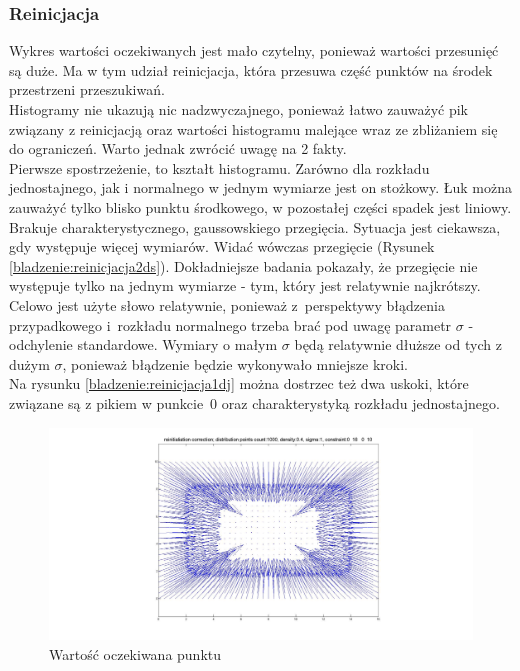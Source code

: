 \documentclass{mini}
\begin{document}
\subsubsection*{Reinicjacja}
Wykres wartości oczekiwanych jest mało czytelny, ponieważ wartości przesunięć są duże. Ma w tym udział reinicjacja, która przesuwa część punktów na środek przestrzeni przeszukiwań.\\
Histogramy nie ukazują nic nadzwyczajnego, ponieważ łatwo zauważyć pik związany z reinicjacją oraz wartości histogramu malejące wraz ze zbliżaniem się do ograniczeń. Warto jednak zwrócić uwagę na 2 fakty.\\
Pierwsze spostrzeżenie, to kształt histogramu. Zarówno dla rozkładu jednostajnego, jak i normalnego w jednym wymiarze jest on stożkowy. Łuk można zauważyć tylko blisko punktu środkowego, w pozostałej części spadek jest liniowy. Brakuje charakterystycznego, gaussowskiego przegięcia. Sytuacja jest ciekawsza, gdy występuje więcej wymiarów. Widać wówczas przegięcie (Rysunek \ref{bladzenie:reinicjacja2ds}). Dokładniejsze badania pokazały, że przegięcie nie występuje tylko na jednym wymiarze - tym, który jest relatywnie najkrótszy. Celowo jest użyte słowo relatywnie, ponieważ z~perspektywy błądzenia przypadkowego i~rozkładu normalnego trzeba brać pod uwagę parametr $\sigma$ - odchylenie standardowe. Wymiary o małym $\sigma$ będą relatywnie dłuższe od tych z dużym $\sigma$, ponieważ błądzenie będzie wykonywało mniejsze kroki.\\
Na rysunku \ref{bladzenie:reinicjacja1dj} można dostrzec też dwa uskoki, które związane są z pikiem w punkcie~$0$ oraz charakterystyką rozkładu jednostajnego.

\begin{figure}[H]
\centering
\includegraphics[width=\textwidth]{reinitialization2dprzesuniecie}
\caption{Wartość oczekiwana punktu}
\end{figure}
\end{document}
